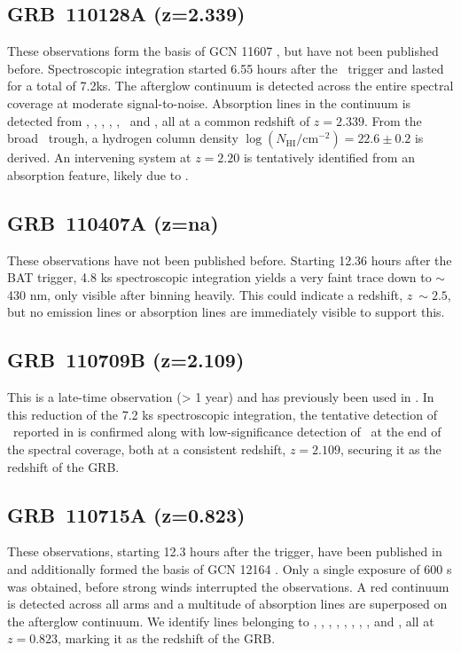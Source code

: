 \documentclass{aa}    %
\begin{document}
\subsection{GRB~110128A (z=2.339)} \label{110128}

These observations form the basis of GCN 11607 \citep{GCN11607}, but have not
been published before. Spectroscopic integration started 6.55 hours after the
\swift~trigger and lasted for a total of 7.2ks. The afterglow continuum is
detected across the entire spectral coverage at moderate signal-to-noise.
Absorption lines in the continuum is detected from \lya, \oi, \cii, \SIiv, \civ,
\SIii~and \feii, all at a common redshift of $z=2.339$. From the broad
\lya~trough, a hydrogen column density $\log (N_{\mathrm{HI}}/\mathrm{cm}^{-2})
= 22.6 \pm 0.2$ is derived. An intervening system at $z=2.20$ is tentatively
identified from an absorption feature, likely due to \civ.

\subsection{GRB~110407A (z=na)} \label{110407}

These observations have not been published before. Starting 12.36 hours after
the BAT trigger, 4.8 ks spectroscopic integration yields a very faint trace down
to $\sim$430 nm, only visible after binning heavily. This could indicate a
redshift, $z ~\sim 2.5$, but no emission lines or absorption lines are
immediately visible to support this.

\subsection{GRB~110709B (z=2.109)} \label{110709}

This is a late-time observation (> 1 year) and has previously been used in
\citet{Perley2016a}. In this reduction of the 7.2 ks spectroscopic integration,
the tentative detection of \oiii~reported in \citet{Perley2016a} is confirmed
along with low-significance detection of \ha~at the end of the spectral
coverage, both at a consistent redshift, $z=2.109$, securing it as the redshift
of the GRB.


\subsection{GRB~110715A (z=0.823)} \label{110715}

These observations, starting 12.3 hours after the trigger, have been published
in \citet{Sanchez-Ramirez2017} and additionally formed the basis of GCN 12164
\citep{GCN12164}. Only a single exposure of 600 s was obtained, before strong
winds interrupted the observations. A red continuum is detected across all arms
and a multitude of absorption lines are superposed on the afterglow continuum.
We identify lines belonging to \alii, \aliii, \znii, \crii, \feii, \mgii, \mgi,
\caii, and \caii, all at  $z=0.823$, marking it as the redshift of the GRB.
\end{document}

